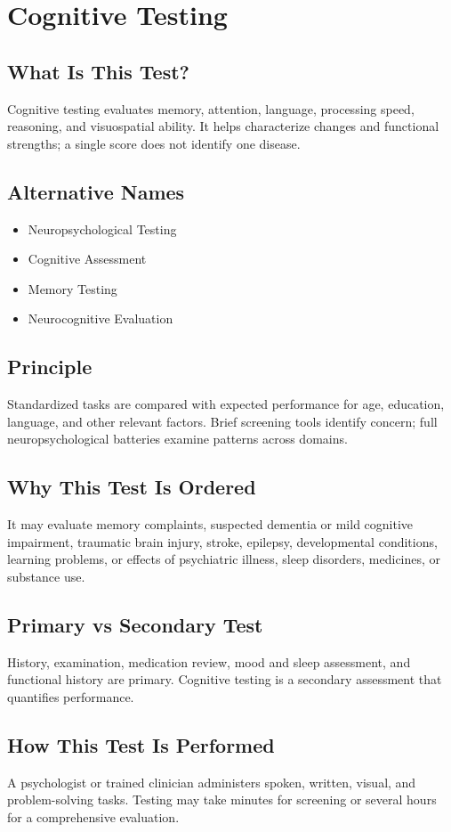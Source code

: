 \chapter{Cognitive Testing}
\section*{What Is This Test?}
Cognitive testing evaluates memory, attention, language, processing speed, reasoning, and visuospatial ability. It helps characterize changes and functional strengths; a single score does not identify one disease.
\section*{Alternative Names}
\begin{itemize}\item Neuropsychological Testing\item Cognitive Assessment\item Memory Testing\item Neurocognitive Evaluation\end{itemize}
\section*{Principle}
Standardized tasks are compared with expected performance for age, education, language, and other relevant factors. Brief screening tools identify concern; full neuropsychological batteries examine patterns across domains.
\section*{Why This Test Is Ordered}
It may evaluate memory complaints, suspected dementia or mild cognitive impairment, traumatic brain injury, stroke, epilepsy, developmental conditions, learning problems, or effects of psychiatric illness, sleep disorders, medicines, or substance use.
\section*{Primary vs Secondary Test}
History, examination, medication review, mood and sleep assessment, and functional history are primary. Cognitive testing is a secondary assessment that quantifies performance.
\section*{How This Test Is Performed}
A psychologist or trained clinician administers spoken, written, visual, and problem-solving tasks. Testing may take minutes for screening or several hours for a comprehensive evaluation.

